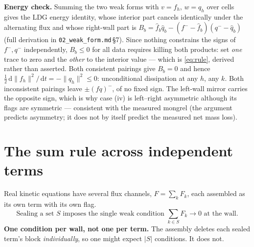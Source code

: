 \documentclass[10pt]{article}
\newcommand{\code}[1]{\texttt{#1}}
\newcommand{\dd}{\,\mathrm{d}}
\newcommand{\hq}{\widehat{q}}
\newcommand{\hf}{\widehat{f}}
\begin{document}
\textbf{Energy check.} Summing the two weak forms with $v=f_h$, $w=q_h$ over
cells gives the LDG energy identity, whose interior part cancels identically
under the alternating flux and whose right-wall part is
$B_b=\hf_b\hq_b-(f^--\hf_b)(q^--\hq_b)$ (full derivation in
\code{02\_weak\_form.md}\,\S7). Since nothing constrains the signs of $f^-,q^-$
independently, $B_b\le0$ for all data requires killing both products: set
\emph{one} trace to zero and the \emph{other} to the interior value --- which is
\eqref{eq:rule}, derived rather than asserted. Both consistent pairings give
$B_b=0$ and hence $\tfrac12\dd\|f_h\|^2/\dd t=-\|q_h\|^2\le0$: unconditional
dissipation at any $h$, any $k$. Both inconsistent pairings leave $\pm(fq)^-$, of
no fixed sign. The left-wall mirror carries the opposite sign, which is why case
(iv) is left--right asymmetric although its flags are symmetric --- consistent
with the measured mongrel (the argument predicts asymmetry; it does not by itself
predict the measured net mass loss).

\section{The sum rule across independent terms}
\label{sec:sum}

Real kinetic equations have several flux channels, $F=\sum_kF_k$, each assembled
as its own term with its own flag.
\begin{equation}
  \boxed{\ \text{Sealing a set } S \text{ imposes the single weak condition }
   \textstyle\sum_{k\in S}F_k \longrightarrow 0 \text{ at the wall.}\ }
  \label{eq:sumrule}
\end{equation}
\textbf{One condition per wall, not one per term.} The assembly deletes each
sealed term's block \emph{individually}, so one might expect $|S|$ conditions. It
does not.
\end{document}
